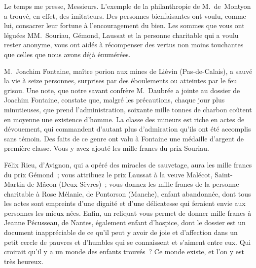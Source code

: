 \documentclass[french,twoside]{book} %
\newcommand\persName[1]{#1}
\newcommand\placeName[1]{#1}
\begin{document}
Le temps me presse, Messieurs. L’exemple de la philanthropie de {\persName M. de Montyon} a trouvé, en effet, des imitateurs. Des personnes bienfaisantes ont voulu, comme lui, consacrer leur fortune à l’encouragement du bien. Les sommes que vous ont léguées {\persName MM. Souriau}, {\persName Gémond}, {\persName Laussat} et la personne charitable qui a voulu rester anonyme, vous ont aidés à récompenser des vertus non moins touchantes que celles que nous avons déjà énumérées.\par
{\persName M. Joachim Fontaine}, maître porion aux mines de {\placeName Liévin} ({\placeName Pas-de-Calais}), a sauvé la vie à seize personnes, surprises par des éboulements ou atteintes par le feu grisou. Une note, que notre savant confrère {\persName M. Daubrée} a jointe au dossier de {\persName Joachim Fontaine}, constate que, malgré les précautions, chaque jour plus minutieuses, que prend l’administration, soixante mille tonnes de charbon coûtent en moyenne une existence d’homme. La classe des mineurs est riche en actes de dévouement, qui commandent d’autant plus d’admiration qu’ils ont été accomplis sans témoin. Des faits de ce genre ont valu à Fontaine une médaille d’argent de première classe. Vous y avez ajouté les mille francs du prix Souriau.\par
{\persName Félix Rieu}, d’{\placeName Avignon}, qui a opéré des miracles de sauvetage, aura les mille francs du prix Gémond ; vous attribuez le prix Laussat à la {\persName veuve Malécot}, {\placeName Saint-Martin-de-Mâcon} ({\placeName Deux-Sèvres}) ; vous donnez les mille francs de la personne charitable à {\persName Rose Mélanie}, de {\placeName Pontorson} ({\placeName Manche}), enfant abandonnée, dont tous les actes sont empreints d’une dignité et d’une délicatesse qui feraient envie aux personnes les mieux nées. Enfin, un reliquat vous permet de donner mille francs à {\persName Jeanne Pécusseau}, de {\placeName Nantes}, également enfant d’hospice, dont le dossier est un document inappréciable de ce qu’il peut y avoir de joie et d’affection dans un petit cercle de pauvres et d’humbles qui se connaissent et s’aiment entre eux. Qui croirait qu’il y a un monde des enfants trouvés ? Ce monde existe, et l’on y est très heureux.\par
\end{document}
